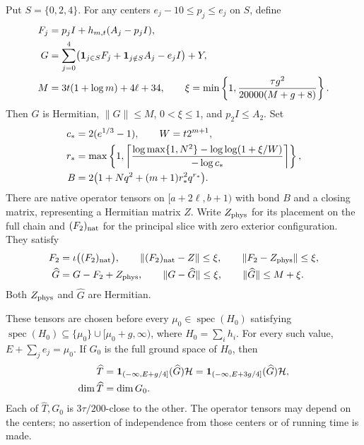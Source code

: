 \begin{lemma}
    Put $S=\{0,2,4\}$. For any centers $e_j-10\le p_j\le e_j$ on $S$, define
    \begin{align}
        F_j & =p_jI+h_{m,t}(A_j-p_jI),\notag                                   \\
        G   & =\sum_{j=0}^4
        \bigl(\mathbf1_{j\in S}F_j+\mathbf1_{j\notin S}A_j-e_jI\bigr)+Y,\notag \\
        M   & =3t(1+\log m)+4\ell+34,\qquad
        \xi=\min\left\{1,\frac{\tau g^2}{20000(M+g+8)}\right\}.
        \label{eq:physical_soft_middle_precision}
    \end{align}
    Then $G$ is Hermitian, $\|G\|\le M$, $0<\xi\le1$, and $p_2I\le A_2$.
    Set
    \begin{align}
        c_* & =2(e^{1/3}-1),\qquad W=t2^{m+1},\notag  \\
        r_* & =\max\left\{1,
        \left\lceil\frac{\log\max\{1,N^2\}-\log\log(1+\xi/W)}
        {-\log c_*}\right\rceil\right\},\notag        \\
        B   & =2\bigl(1+Nq^2+(m+1)r_*^2q^{r_*}\bigr).
        \label{eq:physical_soft_middle_bond}
    \end{align}
    There are native operator tensors on $[a+2\ell,b+1)$ with bond $B$
    and a closing matrix, representing a Hermitian matrix $Z$.
    Write $Z_{\rm phys}$ for its
    placement on the full chain and $(F_2)_{\rm nat}$ for the principal
    slice with zero exterior configuration. They satisfy
    \begin{align}
        F_2        & =\iota\bigl((F_2)_{\rm nat}\bigr),\qquad
        \|(F_2)_{\rm nat}-Z\|\le\xi,\qquad
        \|F_2-Z_{\rm phys}\|\le\xi,\notag                     \\
        \widehat G & =G-F_2+Z_{\rm phys},\qquad
        \|G-\widehat G\|\le\xi,\qquad
        \|\widehat G\|\le M+\xi.
        \label{eq:physical_soft_middle_error}
    \end{align}
    Both $Z_{\rm phys}$ and $\widehat G$ are Hermitian.

    These tensors are chosen before every $\mu_0\in\operatorname{spec}(H_0)$
    satisfying $\operatorname{spec}(H_0)\subseteq\{\mu_0\}\cup[\mu_0+g,\infty)$,
    where $H_0=\sum_i h_i$. For every such value,
    $E+\sum_j e_j=\mu_0$. If $G_0$ is the full ground space of $H_0$, then
    \begin{align}
        \widehat T
                       & =\mathbf1_{(-\infty,E+g/4]}(\widehat G)\mathcal H
        =\mathbf1_{(-\infty,E+3g/4]}(\widehat G)\mathcal H,\notag          \\
        \dim\widehat T & =\dim G_0.
        \label{eq:physical_soft_middle_cluster}
    \end{align}
    Each of $\widehat T,G_0$ is $3\tau/200$-close to the other.
    The operator tensors may depend on the centers; no assertion of
    independence from those centers or of running time is made.
\end{lemma}

